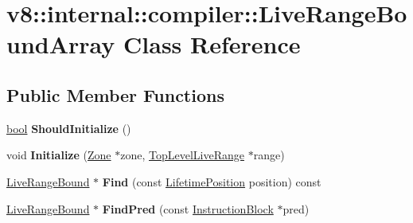 \hypertarget{classv8_1_1internal_1_1compiler_1_1LiveRangeBoundArray}{}\section{v8\+:\+:internal\+:\+:compiler\+:\+:Live\+Range\+Bound\+Array Class Reference}
\label{classv8_1_1internal_1_1compiler_1_1LiveRangeBoundArray}
\subsection*{Public Member Functions}
\begin{DoxyCompactItemize}
\item 
\mbox{\label{classv8_1_1internal_1_1compiler_1_1LiveRangeBoundArray_aae40f67a2814f6a3f64e2de17a7087c6}} 
\mbox{\hyperlink{classbool}{bool}} {\bfseries Should\+Initialize} ()
\item 
\mbox{\label{classv8_1_1internal_1_1compiler_1_1LiveRangeBoundArray_aa4f5c3d190789573f46da09fb138ad4f}} 
void {\bfseries Initialize} (\mbox{\hyperlink{classv8_1_1internal_1_1Zone}{Zone}} $\ast$zone, \mbox{\hyperlink{classv8_1_1internal_1_1compiler_1_1TopLevelLiveRange}{Top\+Level\+Live\+Range}} $\ast$range)
\item 
\mbox{\label{classv8_1_1internal_1_1compiler_1_1LiveRangeBoundArray_a207f398b9e5dc70166e201e67d061100}} 
\mbox{\hyperlink{classv8_1_1internal_1_1compiler_1_1LiveRangeBound}{Live\+Range\+Bound}} $\ast$ {\bfseries Find} (const \mbox{\hyperlink{classv8_1_1internal_1_1compiler_1_1LifetimePosition}{Lifetime\+Position}} position) const
\item 
\mbox{\label{classv8_1_1internal_1_1compiler_1_1LiveRangeBoundArray_a2c68b628f69a622da3d334048fe6a1a2}} 
\mbox{\hyperlink{classv8_1_1internal_1_1compiler_1_1LiveRangeBound}{Live\+Range\+Bound}} $\ast$ {\bfseries Find\+Pred} (const \mbox{\hyperlink{classv8_1_1internal_1_1compiler_1_1InstructionBlock}{Instruction\+Block}} $\ast$pred)
\item 
\mbox{\label{classv8_1_1internal_1_1compiler_1_1LiveRangeBoundArray_adf118fd29ec8eb9dd45f474f3e9fa156}} 

\end{DoxyCompactItemize}
